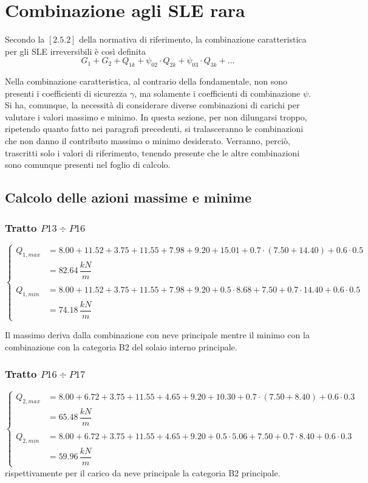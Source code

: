 \section{Combinazione agli SLE rara}
Secondo la $[2.5.2]$ della normativa di riferimento, la combinazione caratteristica per gli SLE irreversibili è così definita
\[
	G_1 + G_2 + Q_{1k} + \psi_{02}\cdot Q_{2k} + \psi_{03}\cdot Q_{3k} + \dots
\]

Nella combinazione caratteristica, al contrario della fondamentale, non sono presenti i coefficienti di sicurezza $\gamma$, ma solamente i coefficienti di combinazione $\psi$. Si ha, comunque, la necessità di considerare diverse combinazioni di carichi per valutare i valori massimo e minimo. In questa sezione, per non dilungarsi troppo, ripetendo quanto fatto nei paragrafi precedenti, si tralasceranno le combinazioni che non danno il contributo massimo o minimo desiderato. Verranno, perciò, trascritti solo i valori di riferimento, tenendo presente che le altre combinazioni sono comunque presenti nel foglio di calcolo.

\subsection{Calcolo delle azioni massime e minime}
\subsubsection*{Tratto $P13\div P16$}
\begin{equation*}
	\begin{cases}
		Q_{1,max} &= 8.00+11.52+3.75 + 11.55+7.98+9.20 + 15.01 + 0.7\cdot(7.50+14.40) + 0.6\cdot0.5\\
		&= 82.64\,\dfrac{kN}{m}\\\\
		Q_{1,min} &= 8.00+11.52+3.75 + 11.55+7.98+9.20 + 0.5\cdot8.68 +7.50 + 0.7\cdot14.40 + 0.6\cdot0.5\\
		&= 74.18\,\dfrac{kN}{m}
	\end{cases}
\end{equation*}

Il massimo deriva dalla combinazione con neve principale mentre il minimo con la combinazione con la categoria B2 del solaio interno principale.

\subsubsection*{Tratto $P16\div P17$}
\begin{equation*}
	\begin{cases}
		Q_{2,max} &= 8.00+6.72+3.75 + 11.55+4.65+9.20 + 10.30 + 0.7\cdot(7.50+8.40) + 0.6\cdot0.3\\
		&= 65.48\,\dfrac{kN}{m}\\\\
		Q_{2,min} &= 8.00+6.72+3.75 + 11.55+4.65+9.20 + 0.5\cdot 5.06 + 7.50 + 0.7\cdot 8.40 + 0.6\cdot0.3\\
		&= 59.96\,\dfrac{kN}{m}
	\end{cases}
\end{equation*}
rispettivamente per il carico da neve principale la categoria B2 principale.

